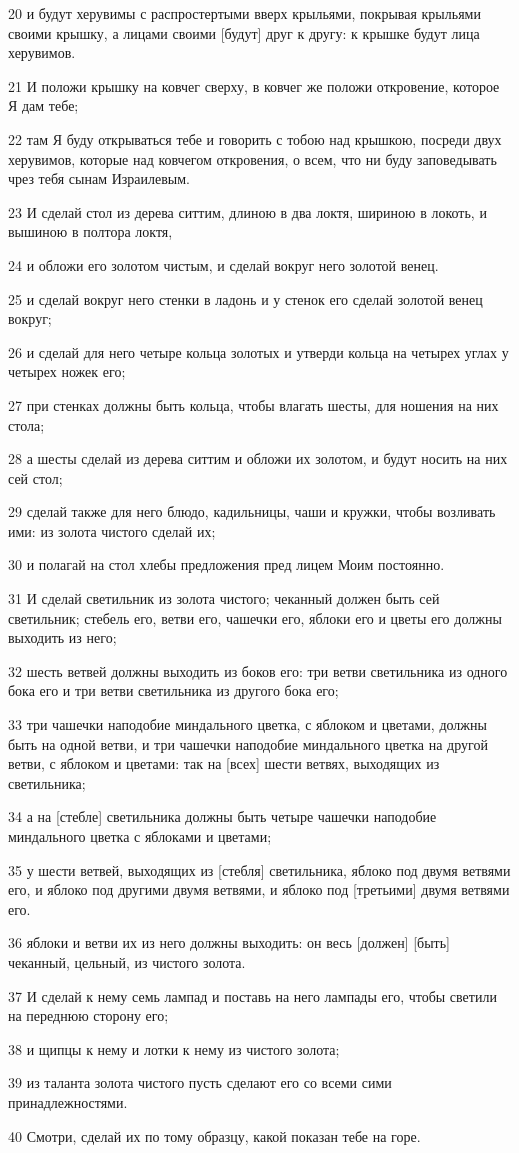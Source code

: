 \par 20 и будут херувимы с распростертыми вверх крыльями, покрывая крыльями своими крышку, а лицами своими [будут] друг к другу: к крышке будут лица херувимов.
\par 21 И положи крышку на ковчег сверху, в ковчег же положи откровение, которое Я дам тебе;
\par 22 там Я буду открываться тебе и говорить с тобою над крышкою, посреди двух херувимов, которые над ковчегом откровения, о всем, что ни буду заповедывать чрез тебя сынам Израилевым.
\par 23 И сделай стол из дерева ситтим, длиною в два локтя, шириною в локоть, и вышиною в полтора локтя,
\par 24 и обложи его золотом чистым, и сделай вокруг него золотой венец.
\par 25 и сделай вокруг него стенки в ладонь и у стенок его сделай золотой венец вокруг;
\par 26 и сделай для него четыре кольца золотых и утверди кольца на четырех углах у четырех ножек его;
\par 27 при стенках должны быть кольца, чтобы влагать шесты, для ношения на них стола;
\par 28 а шесты сделай из дерева ситтим и обложи их золотом, и будут носить на них сей стол;
\par 29 сделай также для него блюдо, кадильницы, чаши и кружки, чтобы возливать ими: из золота чистого сделай их;
\par 30 и полагай на стол хлебы предложения пред лицем Моим постоянно.
\par 31 И сделай светильник из золота чистого; чеканный должен быть сей светильник; стебель его, ветви его, чашечки его, яблоки его и цветы его должны выходить из него;
\par 32 шесть ветвей должны выходить из боков его: три ветви светильника из одного бока его и три ветви светильника из другого бока его;
\par 33 три чашечки наподобие миндального цветка, с яблоком и цветами, должны быть на одной ветви, и три чашечки наподобие миндального цветка на другой ветви, с яблоком и цветами: так на [всех] шести ветвях, выходящих из светильника;
\par 34 а на [стебле] светильника должны быть четыре чашечки наподобие миндального цветка с яблоками и цветами;
\par 35 у шести ветвей, выходящих из [стебля] светильника, яблоко под двумя ветвями его, и яблоко под другими двумя ветвями, и яблоко под [третьими] двумя ветвями его.
\par 36 яблоки и ветви их из него должны выходить: он весь [должен] [быть] чеканный, цельный, из чистого золота.
\par 37 И сделай к нему семь лампад и поставь на него лампады его, чтобы светили на переднюю сторону его;
\par 38 и щипцы к нему и лотки к нему из чистого золота;
\par 39 из таланта золота чистого пусть сделают его со всеми сими принадлежностями.
\par 40 Смотри, сделай их по тому образцу, какой показан тебе на горе.

